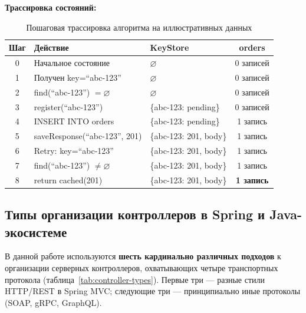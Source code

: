 \textbf{Трассировка состояний:}

\begin{table}[H]
\centering
\caption{Пошаговая трассировка алгоритма на иллюстративных данных}
\label{tab:trace}
\small
\begin{tabularx}{\textwidth}{@{}c X l c@{}}
\toprule
\textbf{Шаг} & \textbf{Действие} & \textbf{KeyStore} & \textbf{orders} \\
\midrule
0 & Начальное состояние & $\varnothing$ & 0 записей \\
1 & Получен key=``abc-123'' & $\varnothing$ & 0 записей \\
2 & find(``abc-123'') $= \varnothing$ & $\varnothing$ & 0 записей \\
3 & register(``abc-123'') & \{abc-123: pending\} & 0 записей \\
4 & INSERT INTO orders & \{abc-123: pending\} & 1 запись \\
5 & saveResponse(``abc-123'', 201) & \{abc-123: 201, body\} & 1 запись \\
\midrule
6 & Retry: key=``abc-123'' & \{abc-123: 201, body\} & 1 запись \\
7 & find(``abc-123'') $\neq \varnothing$ & \{abc-123: 201, body\} & 1 запись \\
8 & return cached(201) & \{abc-123: 201, body\} & \textbf{1 запись} \\
\bottomrule
\end{tabularx}
\end{table}

\subsection{Типы организации контроллеров в Spring и Java-экосистеме}

В данной работе используются \textbf{шесть кардинально различных подходов} к организации серверных контроллеров, охватывающих четыре транспортных протокола (таблица~\ref{tab:controller-types}). Первые три --- разные стили HTTP/REST в Spring MVC; следующие три --- принципиально иные протоколы (SOAP, gRPC, GraphQL).

